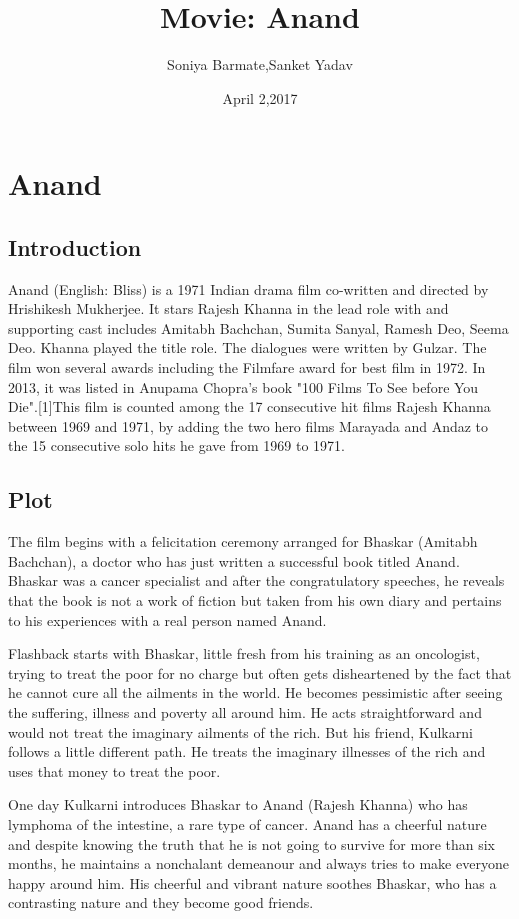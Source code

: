 \documentclass[11pt]{article}
\begin{document}
 

\title{Movie: Anand}
\author{Soniya Barmate,Sanket Yadav}
\date{April 2,2017}
\maketitle
\section*{Anand}
\subsection*{Introduction}
Anand (English: Bliss) is a 1971 Indian drama film co-written and directed by Hrishikesh Mukherjee.
It stars Rajesh Khanna in the lead role with and supporting cast includes Amitabh Bachchan, Sumita Sanyal, 
Ramesh Deo, Seema Deo. Khanna played the title role. The dialogues were written by Gulzar. The film won 
several awards including the Filmfare award for best film in 1972. In 2013, it was listed in Anupama Chopra's
book "100 Films To See before You Die".[1]This film is counted among the 17 consecutive hit films Rajesh Khanna
between 1969 and 1971, by adding the two hero films Marayada and Andaz to the 15 consecutive solo hits he gave 
from 1969 to 1971.
\subsection*{Plot}
The film begins with a felicitation ceremony arranged for Bhaskar (Amitabh Bachchan), a doctor who has just written a successful book titled Anand. Bhaskar was a cancer specialist and after the congratulatory speeches, he reveals that the book is not a work of fiction but taken from his own diary and pertains to his experiences with a real person named Anand.

Flashback starts with Bhaskar, little fresh from his training as an oncologist, trying to treat the poor for no charge but often gets disheartened by the fact that he cannot cure all the ailments in the world. He becomes pessimistic after seeing the suffering, illness and poverty all around him. He acts straightforward and would not treat the imaginary ailments of the rich. But his friend, Kulkarni follows a little different path. He treats the imaginary illnesses of the rich and uses that money to treat the poor.

One day Kulkarni introduces Bhaskar to Anand (Rajesh Khanna) who has lymphoma of the intestine, a rare type of cancer. Anand has a cheerful nature and despite knowing the truth that he is not going to survive for more than six months, he maintains a nonchalant demeanour and always tries to make everyone happy around him. His cheerful and vibrant nature soothes Bhaskar, who has a contrasting nature and they become good friends.
\end{document}
